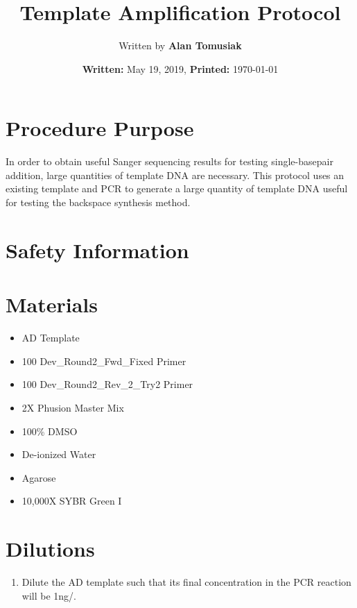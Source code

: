 \documentclass{ssiBio}
\title{Template Amplification Protocol}
\author{Written by \textbf{Alan Tomusiak}}
\date{\textbf{Written:} May 19, 2019, \textbf{Printed:} \today{}}
\begin{document}
\maketitle
\section{Procedure Purpose}
  In order to obtain useful Sanger sequencing results for testing single-basepair addition, large quantities of template DNA are necessary. This protocol uses an existing template and PCR to generate a large quantity of template DNA useful for testing the backspace synthesis method.

\section{Safety Information}
\begin{safety}
  \begin{enumerate}
    \SYBRGOLD
  \end{enumerate}
\end{safety}

\section{Materials}
\begin{itemize}
  \item{AD Template}
  \item{100\uM{} Dev\_Round2\_Fwd\_Fixed Primer}
  \item{100\uM{} Dev\_Round2\_Rev\_2\_Try2 Primer}
  \item{2X Phusion Master Mix}
  \item{100\% DMSO}
  \item{De-ionized Water}
  \item{Agarose}
  \item{10,000X SYBR Green I}
\end{itemize}

\section{Dilutions}
\begin{enumerate}
  \item{Dilute the AD template such that its final concentration in the PCR reaction will be 1ng/\uL.}
\end{enumerate}
\end{document}
